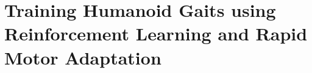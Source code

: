 
\chapter[Chapter 1]
{Training Humanoid Gaits using Reinforcement Learning and Rapid Motor Adaptation}

\address{, 
, 
,
     , }%



\author{Niraj Pudasaini and Nikolaus Correll. Corresponding author: }

\maketitle
\vspace{-8ex}

\begin{abstract}{Abstract}

The rapid success of machine learning 
\end{abstract}

